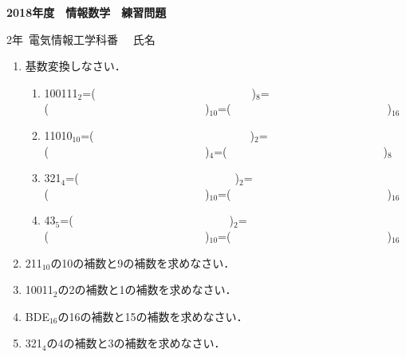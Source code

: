 \documentclass[a4j,9pt,fleqn]{jsarticle}
\begin{document}
\Large\textbf{2018年度　情報数学　練習問題}
\begin{flushright}
2年~電気情報工学科\underline{\hspace{10mm}}番
　氏名\underline{\hspace{50mm}}
\end{flushright}

\begin{enumerate}
\item 基数変換しなさい．

\begin{enumerate}
\item 100111$_{2}$=(~~~~~~~~~~~~~~~~~~~~~~~~~~~~)$_{8}$=(~~~~~~~~~~~~~~~~~~~~~~~~~~~~)$_{10}$=(~~~~~~~~~~~~~~~~~~~~~~~~~~~~)$_{16}$

\item 11010$_{10}$=(~~~~~~~~~~~~~~~~~~~~~~~~~~~~)$_{2}$=(~~~~~~~~~~~~~~~~~~~~~~~~~~~~)$_{4}$=(~~~~~~~~~~~~~~~~~~~~~~~~~~~~)$_{8}$

\item 321$_{4}$=(~~~~~~~~~~~~~~~~~~~~~~~~~~~~)$_{2}$=(~~~~~~~~~~~~~~~~~~~~~~~~~~~~)$_{10}$=(~~~~~~~~~~~~~~~~~~~~~~~~~~~~)$_{16}$

\item 43$_{5}$=(~~~~~~~~~~~~~~~~~~~~~~~~~~~~)$_{2}$=(~~~~~~~~~~~~~~~~~~~~~~~~~~~~)$_{10}$=(~~~~~~~~~~~~~~~~~~~~~~~~~~~~)$_{16}$

\vspace{200pt}

\end{enumerate}

\item 211$_{10}$の10の補数と9の補数を求めなさい．
\vspace{70pt}
\item 10011$_{2}$の2の補数と1の補数を求めなさい．
\vspace{70pt}
\item BDE$_{16}$の16の補数と15の補数を求めなさい．
\vspace{70pt}
\item 321$_4$の4の補数と3の補数を求めなさい．
\vspace{70pt}
\end{enumerate}
\end{document}

